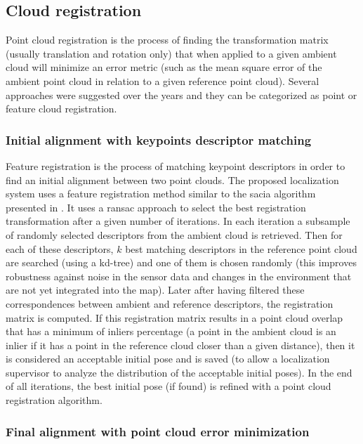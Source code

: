 \subsection{Cloud registration}

Point cloud registration is the process of finding the transformation matrix (usually translation and rotation only) that when applied to a given ambient cloud will minimize an error metric (such as the mean square error of the ambient point cloud in relation to a given reference point cloud). Several approaches were suggested over the years and they can be categorized as point or feature cloud registration.


\subsubsection{Initial alignment with keypoints descriptor matching}\label{subsec:localization-system_feature-registration}

Feature registration is the process of matching keypoint descriptors in order to find an initial alignment between two point clouds. The proposed localization system uses a feature registration method similar to the \gls{sacia} algorithm presented in \cite{Rusu2009}. It uses a \gls{ransac} approach to select the best registration transformation after a given number of iterations. In each iteration a subsample of randomly selected descriptors from the ambient cloud is retrieved. Then for each of these descriptors, $k$ best matching descriptors in the reference point cloud are searched (using a kd-tree) and one of them is chosen randomly (this improves robustness against noise in the sensor data and changes in the environment that are not yet integrated into the map). Later after having filtered these correspondences between ambient and reference descriptors, the registration matrix is computed. If this registration matrix results in a point cloud overlap that has a minimum of inliers percentage (a point in the ambient cloud is an inlier if it has a point in the reference cloud closer than a given distance), then it is considered an acceptable initial pose and is saved (to allow a localization supervisor to analyze the distribution of the acceptable initial poses). In the end of all iterations, the best initial pose (if found) is refined with a point cloud registration algorithm.


\subsubsection{Final alignment with point cloud error minimization}

